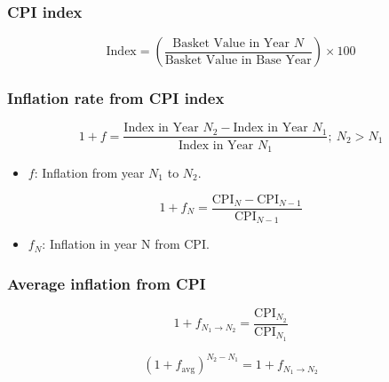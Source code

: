 \subsubsection{CPI index}
    \begin{definition}
        \begin{equation}
            \text{Index} = \left( \frac{\text{Basket Value in Year } N}{\text{Basket Value in Base Year}} \right) \times 100
        \end{equation}
    \end{definition}

\subsubsection{Inflation rate from CPI index}
    \begin{definition}
        \begin{equation}
            1 + f = \frac{\text{Index in Year } N_2 - \text{Index in Year } N_1}{\text{Index in Year } N_1};\: N_2 > N_1
        \end{equation}
        \begin{itemize}
            \item \(f\): Inflation from year $N_1$ to $N_2$.
        \end{itemize}
        \begin{equation}
            1 + f_N = \frac{\text{CPI}_{N} - \text{CPI}_{N-1}}{\text{CPI}_{N-1}}
        \end{equation}
        
        \begin{itemize}
            \item $f_N$: Inflation in year N from CPI.
        \end{itemize}
    \end{definition}

\subsubsection{Average inflation from CPI}
    \begin{definition}
        \begin{equation}
            1 + f_{N_1 \rightarrow N_2} = \frac{\text{CPI}_{N_2}}{\text{CPI}_{N_1}}
        \end{equation}
        
        \begin{equation}
            (1 + f_{\text{avg}})^{N_2 - N_1} = 1 + f_{N_1 \rightarrow N_2}
        \end{equation}
    \end{definition}

